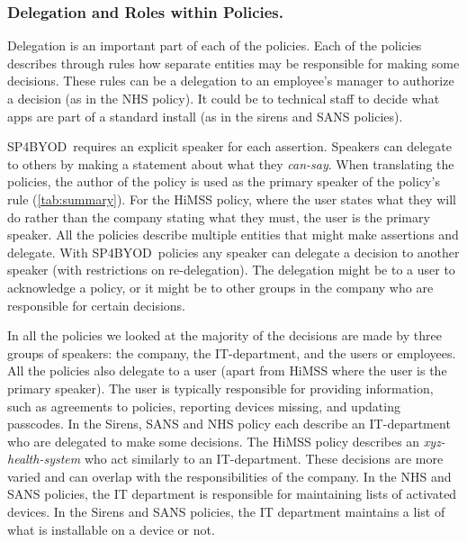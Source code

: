 \documentclass{llncs}
\newcommand{\AppPAL}[0]{SP4BYOD}
\begin{document}
\subsubsection{Delegation and Roles within Policies.}

Delegation is an important part of each of the policies.
Each of the policies describes through rules how separate entities may be responsible for making some decisions.
These rules can be a delegation to an employee's manager to authorize a decision (as in the NHS policy). 
It could be to technical staff to decide what apps are part of a standard install (as in the sirens and SANS policies).

\AppPAL~requires an explicit speaker for each assertion.
Speakers can delegate to others by making a statement about what they \emph{can-say}.
When translating the policies, the author of the policy is used as the primary speaker of the policy's rule (\autoref{tab:summary}).
For the \ac{HiMSS} policy, where the user states what they will do rather than the company stating what they must, the user is the primary speaker.
All the policies describe multiple entities that might make assertions and delegate.
With \AppPAL~policies any speaker can delegate a decision to another speaker (with restrictions on re-delegation).
The delegation might be to a user to acknowledge a policy, or it might be to other groups in the company who are responsible for certain decisions.

In all the policies we looked at the majority of the decisions are made by three groups of speakers: 
  the company, the IT-department, and the users or employees.
All the policies also delegate to a user (apart from \ac{HiMSS} where the user is the primary speaker).
The user is typically responsible for providing information, such as agreements to policies, reporting devices missing, and updating passcodes.
In the Sirens, SANS and NHS policy each describe an IT-department who are delegated to make some decisions.
The \ac{HiMSS} policy describes an \emph{xyz-health-system} who act similarly to an IT-department.
These decisions are more varied and can overlap with the responsibilities of the company.
In the NHS and SANS policies, the IT department is responsible for maintaining lists of activated devices.
In the Sirens and SANS policies, the IT department maintains a list of what is installable on a device or not.
\end{document}
